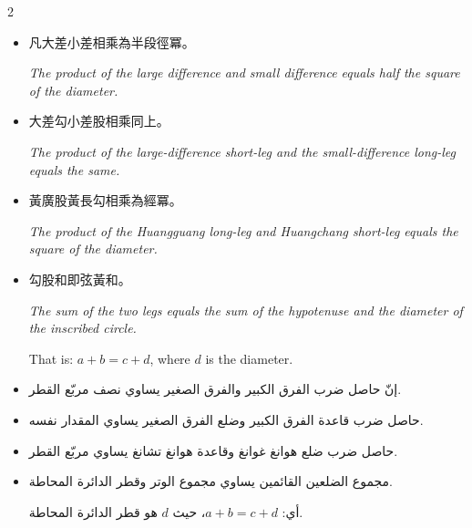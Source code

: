 \documentclass[11pt,a4paper]{article}
\newcommand{\ar}[1]{\arabicfont\beginR #1\endR}
\begin{document}
\begin{paracol}{2}

\begin{itemize}[leftmargin=2em]
  \item 凡大差小差相乘為半段徑冪。
  
  \textit{The product of the large difference and small difference equals half the square of the diameter.}
  
  \item 大差勾小差股相乘同上。
  
  \textit{The product of the large-difference short-leg and the small-difference long-leg equals the same.}
  
  \item 黃廣股黃長勾相乘為經冪。
  
  \textit{The product of the Huangguang long-leg and Huangchang short-leg equals the square of the diameter.}
  
  \item 勾股和即弦黃和。
  
  \textit{The sum of the two legs equals the sum of the hypotenuse and the diameter of the inscribed circle.}
  
  That is: $a + b = c + d$, where $d$ is the diameter.
\end{itemize}

\switchcolumn

\begin{itemize}[leftmargin=2em,rightmargin=0em]
  \item \ar{إنّ حاصل ضرب الفرق الكبير والفرق الصغير يساوي نصف مربّع القطر.}

  \item \ar{حاصل ضرب قاعدة الفرق الكبير وضلع الفرق الصغير يساوي المقدار نفسه.}

  \item \ar{حاصل ضرب ضلع هوانغ غوانغ وقاعدة هوانغ تشانغ يساوي مربّع القطر.}

  \item \ar{مجموع الضلعين القائمين يساوي مجموع الوتر وقطر الدائرة المحاطة.}

  \vspace{0.3cm}

  \ar{أي: $a + b = c + d$، حيث $d$ هو قطر الدائرة المحاطة.}
\end{itemize}

\end{paracol}

\newpage

\end{document}

